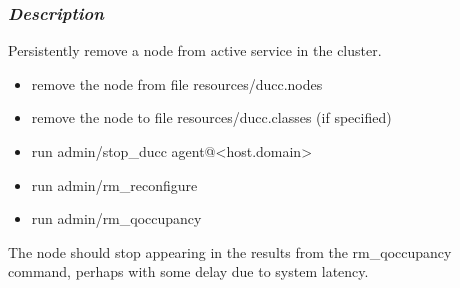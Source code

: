     \subsubsection{{\em Description}}
    Persistently remove a node from active service in the cluster.
    \begin{itemize}
      \item remove the node from file resources/ducc.nodes
      \item remove the node to file resources/ducc.classes (if specified)
      \item run admin/stop\_ducc agent@<host.domain>
      \item run admin/rm\_reconfigure
      \item run admin/rm\_qoccupancy
    \end{itemize}

	The node should stop appearing in the results from the
	rm\_qoccupancy command, perhaps with some delay due to
	system latency.
	